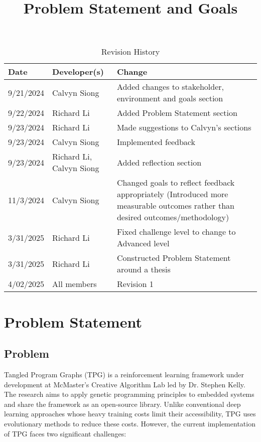 \documentclass{article}
\title{Problem Statement and Goals\\\progname}
\author{\authname}
\date{}
\begin{document}
\maketitle

\begin{table}[hp]
\caption{Revision History} \label{TblRevisionHistory}
\begin{tabularx}{\textwidth}{llX}
\toprule
\textbf{Date} & \textbf{Developer(s)} & \textbf{Change}\\
\midrule
9/21/2024 & Calvyn Siong & Added changes to stakeholder, environment and goals section \\
9/22/2024 & Richard Li & Added Problem Statement section \\
9/23/2024 & Richard Li & Made suggestions to Calvyn's sections \\
9/23/2024 & Calvyn Siong & Implemented feedback \\
9/23/2024 & Richard Li, Calvyn Siong & Added reflection section \\
11/3/2024 & Calvyn Siong & Changed goals to reflect feedback appropriately (Introduced more measurable outcomes rather than desired outcomes/methodology) \\
3/31/2025 & Richard Li & Fixed challenge level to change to Advanced level \\
3/31/2025 & Richard Li & Constructed Problem Statement around a thesis \\
4/02/2025 & All members & Revision 1\\

\bottomrule
\end{tabularx}
\end{table}
\newpage{}
\section{Problem Statement}

\subsection{Problem}

Tangled Program Graphs (TPG) is a reinforcement learning framework under development at McMaster’s Creative Algorithm Lab led by Dr. Stephen Kelly. The research aims to apply genetic programming principles to embedded systems and share the framework as an open-source library. Unlike conventional deep learning approaches whose heavy training costs limit their accessibility, TPG uses evolutionary methods to reduce these costs. However, the current implementation of TPG faces two significant challenges:
\end{document}
